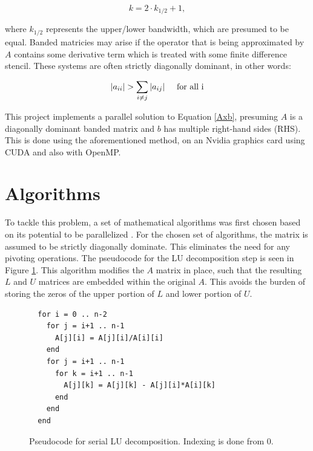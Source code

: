 \documentclass[12pt]{article}
\begin{document}
\begin{equation}
\label{half_k}
k = 2 \cdot k_{1/2} + 1,
\end{equation}

where $k_{1/2}$ represents the upper/lower bandwidth, which are presumed
to be equal. Banded matricies may arise if the operator that is being
approximated by $A$ contains some derivative term which is treated with some
finite difference stencil. These systems are often strictly diagonally
dominant, in other words:

\begin{equation}
|a_{ii}| > \sum\limits_{i \neq j} |a_{ij}| \hspace{0.5cm} \mbox{for all i}
\end{equation}


This project implements a parallel solution to Equation \ref{Axb}, presuming $A$
is a diagonally dominant banded matrix and $b$ has multiple right-hand sides (RHS).
This is done using the aforementioned method, on an Nvidia graphics card using
CUDA and also with OpenMP.


\section{Algorithms}
\label{sec:algorithms}

To tackle this problem, a set of mathematical algorithms was first chosen
based on its potential to be parallelized \cite{Heath}. For the chosen set of
algorithms, the matrix is assumed to be strictly diagonally dominate. This
eliminates the need for any pivoting operations. The pseudocode for the LU
decomposition step is seen in Figure \ref{LUcode}. This algorithm modifies the $A$
matrix in place, such that the resulting $L$ and $U$ matrices are embedded
within the original $A$. This avoids the burden of storing the zeros of the
upper portion of $L$ and lower portion of $U$.

\begin{figure}[H]
\caption{Pseudocode for serial LU decomposition. Indexing is done from 0.}
\label{LUcode}
\begin{lstlisting}
  for i = 0 .. n-2
    for j = i+1 .. n-1
      A[j][i] = A[j][i]/A[i][i]
    end
    for j = i+1 .. n-1
      for k = i+1 .. n-1
        A[j][k] = A[j][k] - A[j][i]*A[i][k]
      end
    end
  end
\end{lstlisting}
\end{figure}
\end{document}
